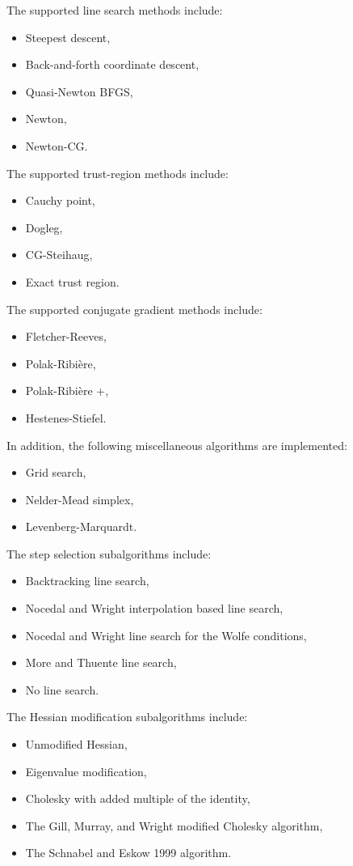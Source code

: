 The supported line search methods include:
\begin{itemize}
  \item Steepest descent,
  \item Back-and-forth coordinate descent,
  \item Quasi-Newton BFGS,
  \item Newton,
  \item Newton-CG.
\end{itemize}

The supported trust-region methods include:
\begin{itemize}
  \item Cauchy point,
  \item Dogleg,
  \item CG-Steihaug,
  \item Exact trust region.
\end{itemize}

The supported conjugate gradient methods include:
\begin{itemize}
  \item Fletcher-Reeves,
  \item Polak-Ribi\`ere,
  \item Polak-Ribi\`ere +,
  \item Hestenes-Stiefel.
\end{itemize}

In addition, the following miscellaneous algorithms are implemented:
\begin{itemize}
  \item Grid search,
  \item Nelder-Mead simplex,
  \item Levenberg-Marquardt.
\end{itemize}

The step selection subalgorithms include:
\begin{itemize}
  \item Backtracking line search,
  \item Nocedal and Wright interpolation based line search,
  \item Nocedal and Wright line search for the Wolfe conditions,
  \item More and Thuente line search,
  \item No line search.
\end{itemize}

The Hessian modification subalgorithms include: 
\begin{itemize}
  \item Unmodified Hessian,
  \item Eigenvalue modification,
  \item Cholesky with added multiple of the identity,
  \item The Gill, Murray, and Wright modified Cholesky algorithm,
  \item The Schnabel and Eskow 1999 algorithm.
\end{itemize}

